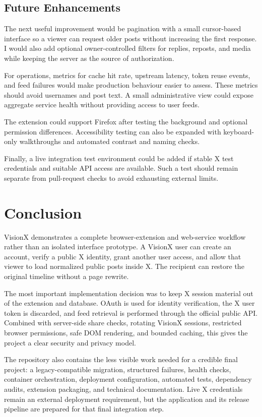 \documentclass[11pt,a4paper]{report}
\begin{document}
\section{Future Enhancements}
The next useful improvement would be pagination with a small cursor-based
interface so a viewer can request older posts without increasing the first
response. I would also add optional owner-controlled filters for replies,
reposts, and media while keeping the server as the source of authorization.

For operations, metrics for cache hit rate, upstream latency, token reuse
events, and feed failures would make production behaviour easier to assess.
These metrics should avoid usernames and post text. A small administrative
view could expose aggregate service health without providing access to user
feeds.

The extension could support Firefox after testing the background and optional
permission differences. Accessibility testing can also be expanded with
keyboard-only walkthroughs and automated contrast and naming checks.

Finally, a live integration test environment could be added if stable X test
credentials and suitable API access are available. Such a test should remain
separate from pull-request checks to avoid exhausting external limits.

\chapter{Conclusion}
VisionX demonstrates a complete browser-extension and web-service workflow
rather than an isolated interface prototype. A VisionX user can create an
account, verify a public X identity, grant another user access, and allow that
viewer to load normalized public posts inside X. The recipient can restore the
original timeline without a page rewrite.

The most important implementation decision was to keep X session material out
of the extension and database. OAuth is used for identity verification, the X
user token is discarded, and feed retrieval is performed through the official
public API. Combined with server-side share checks, rotating VisionX sessions,
restricted browser permissions, safe DOM rendering, and bounded caching, this
gives the project a clear security and privacy model.

The repository also contains the less visible work needed for a credible final
project: a legacy-compatible migration, structured failures, health checks,
container orchestration, deployment configuration, automated tests,
dependency audits, extension packaging, and technical documentation. Live X
credentials remain an external deployment requirement, but the application
and its release pipeline are prepared for that final integration step.
\end{document}
